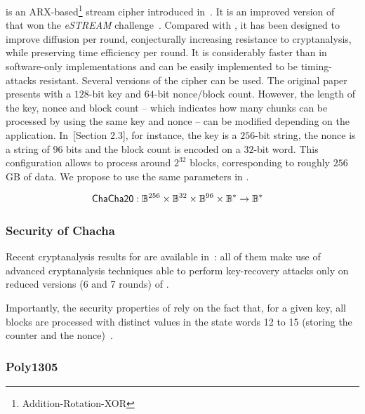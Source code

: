  is an ARX-based\footnote{Addition-Rotation-XOR} stream cipher introduced in~\cite{bernstein2008chacha}. It is an improved version of ~\cite{Bernstein:2008:SFS:1423346.1423354} that won the \emph{eSTREAM} challenge~\cite{estreamchallenge}. Compared with , it has been designed to improve diffusion per round, conjecturally increasing resistance to cryptanalysis, while preserving time efficiency per round. It is considerably faster than \aes{} in software-only implementations and can be easily implemented to be timing-attacks resistant. Several versions of the cipher can be used. The original paper presents  with a $128$-bit key and $64$-bit nonce/block count. However, the length of the key, nonce and block count -- which indicates how many chunks can be processed by using the same key and nonce -- can be modified depending on the application. In~\cite{langley2018chacha20}[Section 2.3], for instance, the key is a $256$-bit string, the nonce is a string of $96$ bits and the block count is encoded on a $32$-bit word. This configuration allows to process around $2^{32}$ blocks, corresponding to roughly $256$\,GB of data. We propose to use the same parameters in \zeth{}.

\begin{align*}
    \mathsf{ChaCha20}&: \mathbb{B}^{256} \times \mathbb{B}^{32} \times \mathbb{B}^{96} \times \mathbb{B}^{*} \to \mathbb{B}^{*}
\end{align*}

\subsubsection{Security of Chacha}

Recent cryptanalysis results for \chacha{} are available in~\cite{aumasson2008new,ishiguro2012modified, shi2012improved, maitra2016chosen, choudhuri2016differential, choudhuri2017maitra}: all of them make use of advanced cryptanalysis techniques able to perform key-recovery attacks only on reduced versions (6 and 7 rounds) of \chacha{}.

\begin{notebox}
    Importantly, the security properties of \chacha{} rely on the fact that, for a given key, all blocks are processed with distinct values in the state words 12 to 15 (storing the counter and the nonce)~\cite[Section 2.3]{langley2018chacha20}.
\end{notebox}

\subsubsection{Poly1305}\label{instantiation:enc:algos:poly1305}

